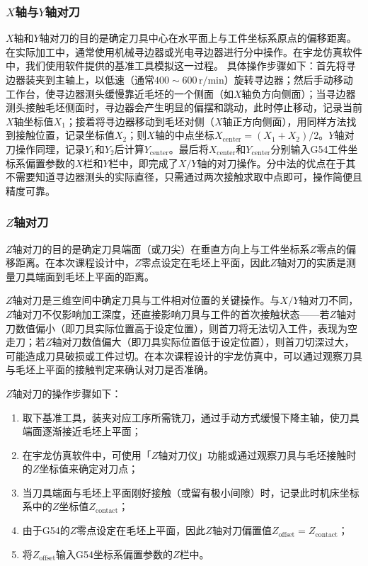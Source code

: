 \documentclass{xautCADreport}
\begin{document}
\subsubsection{$X$轴与$Y$轴对刀}

$X$轴和$Y$轴对刀的目的是确定刀具中心在水平面上与工件坐标系原点的偏移距离。在实际加工中，通常使用机械寻边器或光电寻边器进行分中操作。在宇龙仿真软件中，我们使用软件提供的基准工具模拟这一过程。
具体操作步骤如下：首先将寻边器装夹到主轴上，以低速（通常$400\sim600\,\mathrm{r/min}$）旋转寻边器；然后手动移动工作台，使寻边器测头缓慢靠近毛坯的一个侧面（如$X$轴负方向侧面）；当寻边器测头接触毛坯侧面时，寻边器会产生明显的偏摆和跳动，此时停止移动，记录当前$X$轴坐标值$X_1$；接着将寻边器移动到毛坯对侧（$X$轴正方向侧面），用同样方法找到接触位置，记录坐标值$X_2$；则$X$轴的中点坐标$X_{\mathrm{center}} = (X_1 + X_2)/2$。$Y$轴对刀操作同理，记录$Y_1$和$Y_2$后计算$Y_{\mathrm{center}}$。最后将$X_{\mathrm{center}}$和$Y_{\mathrm{center}}$分别输入G54工件坐标系偏置参数的$X$栏和$Y$栏中，即完成了$X/Y$轴的对刀操作。分中法的优点在于其不需要知道寻边器测头的实际直径，只需通过两次接触求取中点即可，操作简便且精度可靠。


\subsubsection{$Z$轴对刀}

$Z$轴对刀的目的是确定刀具端面（或刀尖）在垂直方向上与工件坐标系$Z$零点的偏移距离。在本次课程设计中，$Z$零点设定在毛坯上平面，因此$Z$轴对刀的实质是测量刀具端面到毛坯上平面的距离。

$Z$轴对刀是三维空间中确定刀具与工件相对位置的关键操作。与$X/Y$轴对刀不同，$Z$轴对刀不仅影响加工深度，还直接影响刀具与工件的首次接触状态——若$Z$轴对刀数值偏小（即刀具实际位置高于设定位置），则首刀将无法切入工件，表现为空走刀；若$Z$轴对刀数值偏大（即刀具实际位置低于设定位置），则首刀切深过大，可能造成刀具破损或工件过切。在本次课程设计的宇龙仿真中，可以通过观察刀具与毛坯上平面的接触判定来确认对刀是否准确。


$Z$轴对刀的操作步骤如下：

\begin{enumerate}
  \item 取下基准工具，装夹对应工序所需铣刀，通过手动方式缓慢下降主轴，使刀具端面逐渐接近毛坯上平面；
  \item 在宇龙仿真软件中，可使用「$Z$轴对刀仪」功能或通过观察刀具与毛坯接触时的$Z$坐标值来确定对刀点；
  \item 当刀具端面与毛坯上平面刚好接触（或留有极小间隙）时，记录此时机床坐标系中的$Z$坐标值$Z_{\text{contact}}$；
  \item 由于G54的$Z$零点设定在毛坯上平面，因此$Z$轴对刀偏置值$Z_{\text{offset}} = Z_{\text{contact}}$；
  \item 将$Z_{\text{offset}}$输入G54坐标系偏置参数的$Z$栏中。
\end{enumerate}
\end{document}
